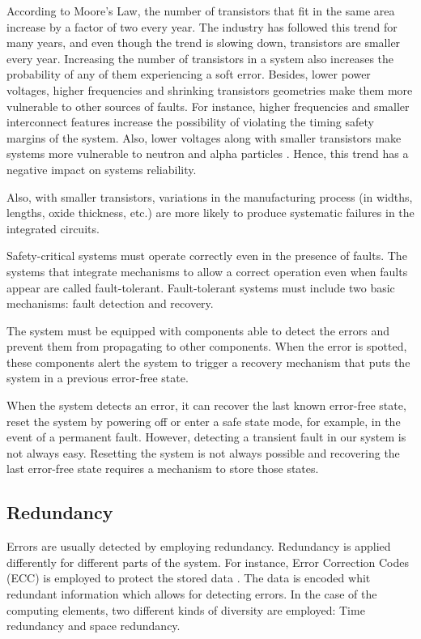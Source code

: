 According to Moore's Law, the number of transistors that fit in the same area increase by a factor of two every year. The industry has followed this trend for many years, and even though the trend is slowing down, transistors are smaller every year. Increasing the number of transistors in a system also increases the probability of any of them experiencing a soft error. Besides, lower power voltages, higher frequencies and shrinking transistors geometries make them more vulnerable to other sources of faults. For instance, higher frequencies and smaller interconnect features increase the possibility of violating the timing safety margins of the system. Also, lower voltages along with smaller transistors make systems more vulnerable to neutron and alpha particles \cite{constantinescu2003trends}. Hence, this trend has a negative impact on systems reliability. 

Also, with smaller transistors, variations in the manufacturing process (in widths, lengths, oxide thickness, etc.) are more likely to produce systematic failures in the integrated circuits. 

Safety-critical systems must operate correctly even in the presence of faults. The systems that integrate mechanisms to allow a correct operation even when faults appear are called fault-tolerant. Fault-tolerant systems must include two basic mechanisms: fault detection and recovery.

The system must be equipped with components able to detect the errors and prevent them from propagating to other components. When the error is spotted, these components alert the system to trigger a recovery mechanism that puts the system in a previous error-free state.

When the system detects an error, it can recover the last known error-free state, reset the system by powering off or enter a safe state mode, for example, in the event of a permanent fault. However, detecting a transient fault in our system is not always easy. Resetting the system is not always possible and recovering the last error-free state requires a mechanism to store those states. 

\bigskip



\subsection{Redundancy}

Errors are usually detected by employing redundancy. Redundancy is applied differently for different parts of the system. For instance, Error Correction Codes (ECC) is employed to protect the stored data \cite{alcaide2019software}. The data is encoded whit redundant information which allows for detecting errors. In the case of the computing elements, two different kinds of diversity are employed: Time redundancy and space redundancy.

